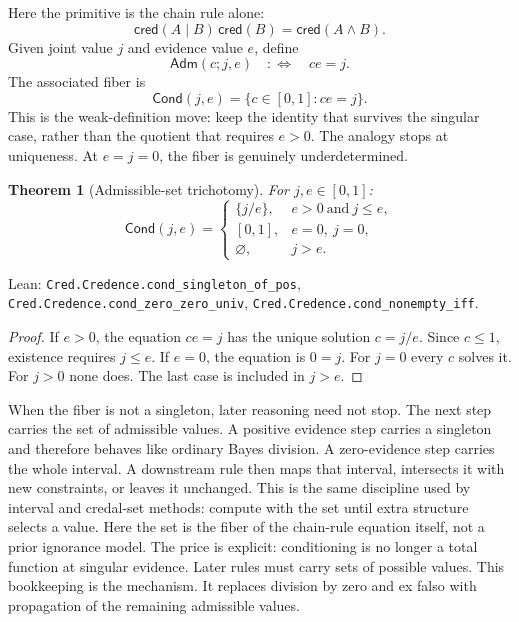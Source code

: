 \documentclass[11pt,a4paper]{article}
\newtheorem{theorem}{Theorem}[section]
\newcommand{\cred}{\mathsf{cred}}
\newcommand{\Cond}{\mathsf{Cond}}
\newcommand{\Adm}{\mathsf{Adm}}
\newcommand{\Lean}[1]{\texttt{#1}}
\begin{document}
Here the primitive is the chain rule alone:
\[
  \cred(A\mid B)\,\cred(B)=\cred(A\land B).
\]
Given joint value $j$ and evidence value $e$, define
\[
  \Adm(c;j,e)\quad:\Longleftrightarrow\quad c e=j.
\]
The associated fiber is
\[
  \Cond(j,e)=\{c\in[0,1]:c e=j\}.
\]
This is the weak-definition move: keep the identity that survives the
singular case, rather than the quotient that requires $e>0$.  The
analogy stops at uniqueness.  At $e=j=0$, the fiber is genuinely
underdetermined.

\begin{theorem}[Admissible-set trichotomy]
\label{thm:trichotomy}
For $j,e\in[0,1]$:
\[
\Cond(j,e)=
\begin{cases}
\{j/e\}, & e>0\ \text{and}\ j\le e,\\[2mm]
[0,1], & e=0,\ j=0,\\[1mm]
\varnothing, & j>e.
\end{cases}
\]
\end{theorem}

\noindent
Lean:
\Lean{Cred.Credence.cond\_singleton\_of\_pos},
\Lean{Cred.Credence.cond\_zero\_zero\_univ},
\Lean{Cred.Credence.cond\_nonempty\_iff}.

\begin{proof}
If $e>0$, the equation $ce=j$ has the unique solution $c=j/e$.
Since $c\le1$, existence requires $j\le e$.
If $e=0$, the equation is $0=j$.  For $j=0$ every $c$ solves it.
For $j>0$ none does.  The last case is included in $j>e$.
\end{proof}

When the fiber is not a singleton, later reasoning need not stop.
The next step carries the set of admissible values.  A positive
evidence step carries a singleton and therefore behaves like ordinary
Bayes division.  A zero-evidence step carries the whole interval.  A
downstream rule then maps that interval, intersects it with new
constraints, or leaves it unchanged.  This is the same discipline used
by interval and credal-set methods: compute with the set until extra
structure selects a value.  Here the set is the fiber of the
chain-rule equation itself, not a prior ignorance model.
The price is explicit: conditioning is no longer a total function at
singular evidence.  Later rules must carry sets of possible values.
This bookkeeping is the mechanism.  It replaces division by zero and
ex falso with propagation of the remaining admissible values.
\end{document}
